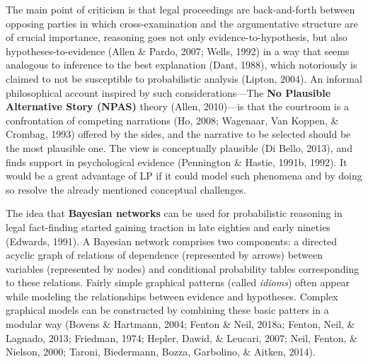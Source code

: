 \documentclass[11pt,dvipsnames,enabledeprecatedfontcommands]{scrartcl}
\begin{document}
The main point of criticism is that legal proceedings are back-and-forth
between opposing parties in which cross-examination and the
argumentative structure are of crucial importance, reasoning goes not
only evidence-to-hypothesis, but also hypotheses-to-evidence (Allen \&
Pardo, 2007; Wells, 1992) in a way that seems analogous to inference to
the best explanation (Dant, 1988), which notoriously is claimed to not
be susceptible to probabilistic analysis (Lipton, 2004). An informal
philosophical account inspired by such considerations---The
\textbf{No Plausible Alternative Story (NPAS)} theory (Allen, 2010)---is
that the courtroom is a confrontation of competing narrations (Ho, 2008;
Wagenaar, Van Koppen, \& Crombag, 1993) offered by the sides, and the
narrative to be selected should be the most plausible one. The view is
conceptually plausible (Di Bello, 2013), and finds support in
psychological evidence (Pennington \& Hastie, 1991b, 1992). It would be
a great advantage of LP if it could model such phenomena and by doing so
resolve the already mentioned conceptual challenges.

The idea that \textbf{Bayesian networks} can be used for probabilistic
reasoning in legal fact-finding started gaining traction in late
eighties and early nineties (Edwards, 1991). A Bayesian network
comprises two components: a directed acyclic graph of relations of
dependence (represented by arrows) between variables (represented by
nodes) and conditional probability tables corresponding to these
relations. Fairly simple graphical patterns (called \emph{idioms}) often
appear while modeling the relationships between evidence and hypotheses.
Complex graphical models can be constructed by combining these basic
patters in a modular way (Bovens \& Hartmann, 2004; Fenton \& Neil,
2018a; Fenton, Neil, \& Lagnado, 2013; Friedman, 1974; Hepler, Dawid, \&
Leucari, 2007; Neil, Fenton, \& Nielson, 2000; Taroni, Biedermann,
Bozza, Garbolino, \& Aitken, 2014).
\end{document}
